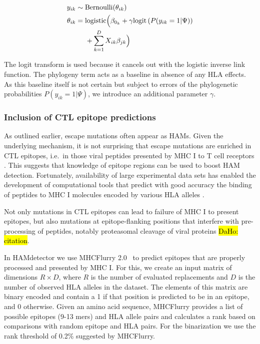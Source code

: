 \documentclass{bioinfo}
\begin{document}
\begin{methods}
\begin{equation}
\begin{aligned}
  y_{ik}  & \sim \text{Bernoulli}(\theta_{ik}) \\
  \theta_{ik}  & =  \text{logistic}\Bigl(\beta_{0_{k}} + \gamma \text{logit}\left(P(y_{ik}=1|\Psi)\right) \\
  &\;\;\;\;\; + \sum_{k=1}^{D}X_{ik}\beta_{jk}\Bigr)
  \label{eq:phylogeny}
\end{aligned}
\end{equation}


The logit transform is used because it cancels out with the logistic inverse link function. The phylogeny term acts as a baseline in absence of any HLA effects. As this baseline itself is not certain but subject to errors of the phylogenetic probabilities $P(y_{ik}=1|\Psi)$, we introduce an additional parameter $\gamma$.

\subsubsection{Inclusion of CTL epitope predictions}


As outlined earlier, escape mutations often appear as HAMs. Given the underlying mechanism, it is not surprising that escape mutations are enriched in CTL epitopes, i.e.\ in those viral peptides presented by MHC I to T cell receptors \citep{Bronke2013}. This suggests that knowledge of epitope regions can be used to boost HAM detection. Fortunately, availability of large experimental data sets \citep{Vita2019} has enabled the development of computational tools that predict with good accuracy the binding of peptides to MHC I molecules encoded by various HLA alleles \citep{Mei2020}. 

Not only mutations in CTL epitopes can lead to failure of MHC I to present epitopes, but also mutations at epitope-flanking positions that interfere with pre-processing of peptides, notably proteasomal cleavage of viral proteins \hl{DaHo: citation}.

In HAMdetector we use MHCFlurry 2.0~\citep{ODonnell2020} to predict epitopes that are properly processed and presented by MHC I. For this, we create an input matrix of dimensions $R\times D$, where $R$ is the number of evaluated replacements and $D$ is the number of observed HLA alleles in the dataset. The elements of this matrix are binary encoded and contain a 1 if that position is predicted to be in an epitope, and 0 otherwise. Given an amino acid sequence, MHCFlurry provides a list of possible epitopes (9-13 mers) and HLA allele pairs and calculates a rank based on comparisons with random epitope and HLA pairs. For the binarization we use the rank threshold of 0.2\% suggested by MHCFlurry.


\end{methods}
\end{document}

